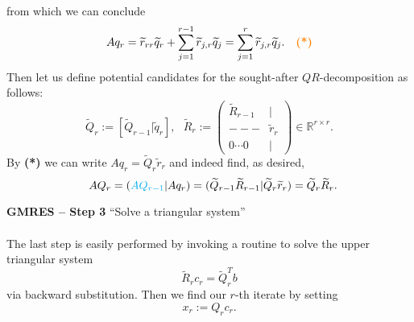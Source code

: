 \begin{frame}
\begin{align*}
\end{align*}
from which we can conclude
$$Aq_r =\widetilde{r}_{rr}\widetilde{q}_r+\sum_{j=1}^{r-1}\widetilde{r}_{j,r}\widetilde{q}_j=\sum_{j=1}^{r}\widetilde{r}_{j,r}\widetilde{q}_j.~~~\textbf{\color{orange}(*)}
$$
Then let us define potential candidates for the sought-after $QR$-decomposition as follows:
$$
\widetilde{Q}_r:=[\widetilde{Q}_{r-1} | \widetilde{q}_r],~~~
\widetilde{R}_r:=
\begin{pmatrix}
\widetilde{R}_{r-1}&|\\
---&\widetilde{r}_r\\
0\cdots 0 &|
\end{pmatrix}\in\mathbb{R}^{r\times r}.
$$
By \textbf{\color{orange}(*)} we can write $Aq_r  =\widetilde{Q}_r\widetilde{r}_r$ and indeed find, as desired,
$$~~AQ_r =({\color{cyan}AQ_{r-1} }|Aq_r)
=(\widetilde{Q}_{r-1}\widetilde{R}_{r-1}|\widetilde{Q}_r\widetilde{r}_r)=\widetilde{Q}_r\widetilde{R}_r.
 $$
\end{frame}

\begin{frame}
 \textbf{GMRES -- Step 3}
 ``Solve a triangular system''
 ~\\~\\
 The last step is easily performed by invoking a routine to solve the upper triangular system
 $$
 \widetilde{R}_rc_r=\widetilde{Q}_r^Tb$$ via backward substitution. Then we find our $r$-th iterate by setting
 $$x_r:=Q_rc_r.$$
\end{frame}





